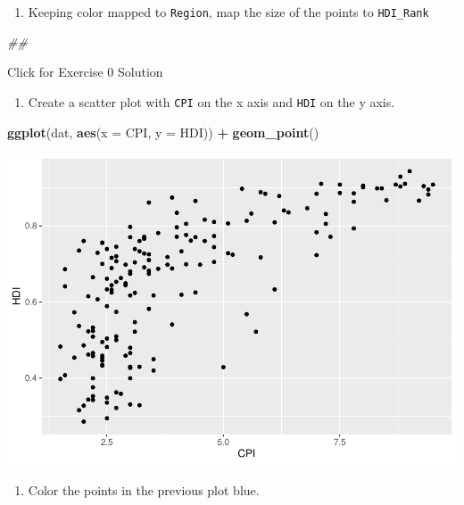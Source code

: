 \documentclass[]{book}
\newenvironment{Shaded}{\begin{snugshade}}{\end{snugshade}}
\newcommand{\CommentTok}[1]{\textcolor[rgb]{0.56,0.35,0.01}{\textit{#1}}}
\newcommand{\DataTypeTok}[1]{\textcolor[rgb]{0.13,0.29,0.53}{#1}}
\newcommand{\KeywordTok}[1]{\textcolor[rgb]{0.13,0.29,0.53}{\textbf{#1}}}
\newcommand{\NormalTok}[1]{#1}
\newcommand{\OperatorTok}[1]{\textcolor[rgb]{0.81,0.36,0.00}{\textbf{#1}}}
\newcommand{\StringTok}[1]{\textcolor[rgb]{0.31,0.60,0.02}{#1}}
\providecommand{\tightlist}{%
  \setlength{\itemsep}{0pt}\setlength{\parskip}{0pt}}
\begin{document}
\begin{enumerate}
\def\labelenumi{\arabic{enumi}.}
\setcounter{enumi}{4}
\tightlist
\item
  Keeping color mapped to \texttt{Region}, map the size of the points to \texttt{HDI\_Rank}
\end{enumerate}

\begin{Shaded}
\begin{Highlighting}[]
\CommentTok{## }
\end{Highlighting}
\end{Shaded}

{Click for Exercise 0 Solution}

\begin{enumerate}
\def\labelenumi{\arabic{enumi}.}
\tightlist
\item
  Create a scatter plot with \texttt{CPI} on the x axis and \texttt{HDI} on the y axis.
\end{enumerate}

\begin{Shaded}
\begin{Highlighting}[]
\KeywordTok{ggplot}\NormalTok{(dat, }\KeywordTok{aes}\NormalTok{(}\DataTypeTok{x =}\NormalTok{ CPI, }\DataTypeTok{y =}\NormalTok{ HDI)) }\OperatorTok{+}
\StringTok{  }\KeywordTok{geom_point}\NormalTok{()}
\end{Highlighting}
\end{Shaded}

\includegraphics{R/Rgraphics/figures/unnamed-chunk-159-1.pdf}

\begin{enumerate}
\def\labelenumi{\arabic{enumi}.}
\setcounter{enumi}{1}
\tightlist
\item
  Color the points in the previous plot blue.
\end{enumerate}
\end{document}
